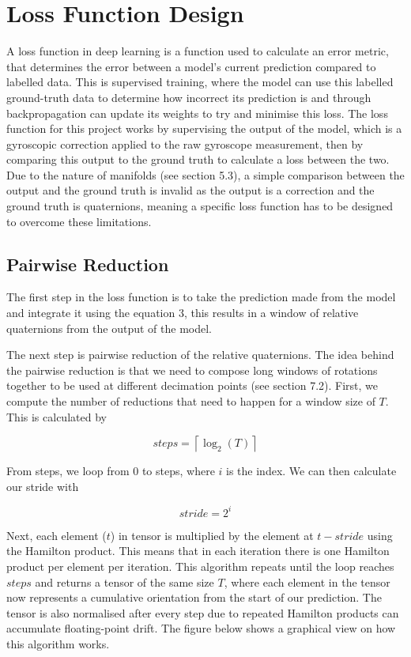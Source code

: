 \newpage
\section{Loss Function Design}
A loss function in deep learning is a function used to calculate an error metric, that determines the error between a model's current prediction 
compared to labelled data. This is supervised training, where the model can use this labelled ground-truth data to determine how incorrect its prediction is 
and through backpropagation can update its weights to try and minimise this loss. The loss function for this project works by supervising the output 
of the model, which is a gyroscopic correction applied to the raw gyroscope measurement, then by comparing this output to the ground truth to calculate a loss 
between the two. Due to the nature of manifolds (see section 5.3), a simple comparison between the output and the ground truth is invalid as the output is a
correction and the ground truth is quaternions, meaning a specific loss function has to be designed to overcome these limitations.

\subsection{Pairwise Reduction}
The first step in the loss function is to take the prediction made from the model and integrate it using the equation 3, this results in a window of 
relative quaternions from the output of the model. 

The next step is pairwise reduction of the relative quaternions. The idea behind the pairwise reduction is that we need to compose long windows of rotations together
to be used at different decimation points (see section 7.2). First, we compute the number of reductions that need to happen for a window size of $T$. 
This is calculated by 

\begin{equation}
    steps = \left\lceil \log_{2}(T) \right\rceil
\end{equation}

From steps, we loop from 0 to steps, where $i$ is the index. We can then calculate our stride with 

\begin{equation}
    stride = 2^{i}
\end{equation}


Next, each element ($t$) in tensor is multiplied by the element at  $t - stride$ using the Hamilton product. This means that in each iteration there is 
one Hamilton product per element per iteration. This algorithm repeats until the loop reaches $steps$ and returns a tensor of the same size $T$, 
where each element in the tensor now represents a cumulative orientation from the start of our prediction. The tensor is also normalised after every 
step due to repeated Hamilton products can accumulate floating-point drift.   
The figure below shows a graphical view on how this algorithm works.    

